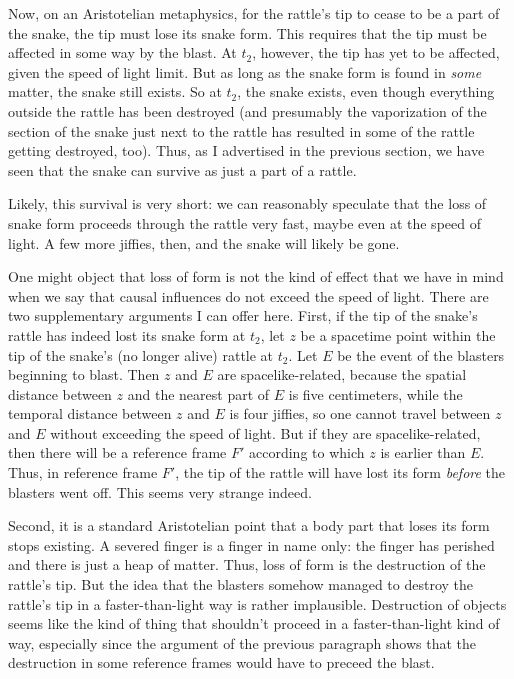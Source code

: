 Now, on an Aristotelian metaphysics, for the rattle's tip to cease to be a part of the snake, the tip
must lose its snake form. This requires that the tip must be affected in some way by the blast. At
$t_2$, however, the tip has yet to be affected, given the speed of light limit.
But as long as the snake form is found in \textit{some} matter, the snake still exists. So 
at $t_2$, the snake exists, even though everything outside the rattle has been destroyed (and presumably the vaporization of 
the section of the snake just next to the rattle has resulted in some of the rattle getting destroyed, too). Thus, as I advertised 
in the previous section, we have seen that the snake can survive as just a part of a rattle.

Likely, this survival is very short: we can reasonably speculate that the loss of snake form proceeds through the rattle 
very fast, maybe even at the speed of light. A few more jiffies, then, and the snake will likely be gone.

One might object that loss of form is not the kind of effect that we have in mind when we say that causal influences do not 
exceed the speed of light. There are two supplementary arguments I can offer here. First, if the tip of the snake's rattle 
has indeed lost its snake form at $t_2$, let $z$ be a spacetime point within the tip of the snake's (no longer alive) rattle 
at $t_2$. Let $E$ be the event of the blasters beginning to blast. Then $z$ and $E$ are spacelike-related, because the spatial 
distance between $z$ and the nearest part of $E$ is five centimeters, while the temporal distance between $z$ and $E$ is four
jiffies, so one cannot travel between $z$ and $E$ without exceeding the speed of light. But if they are spacelike-related, then
there will be a reference frame $F'$ according to which $z$ is earlier than $E$. Thus, in reference frame $F'$, the tip of the 
rattle will have lost its form \textit{before} the blasters went off. This seems very strange indeed.

Second, it is a standard Aristotelian point that a body part that loses its form stops existing. A severed finger is a 
finger in name only: the finger has perished and there is just a heap of matter. Thus, loss of form is the destruction 
of the rattle's tip. But the idea that the blasters somehow managed to destroy the rattle's tip in a faster-than-light 
way is rather implausible. Destruction of objects seems like the kind of thing that shouldn't proceed in a faster-than-light
kind of way, especially since the argument of the previous paragraph shows that the destruction in some reference frames 
would have to preceed the blast. 

